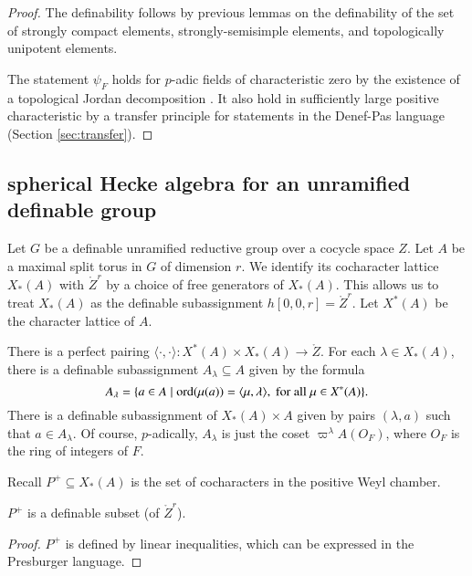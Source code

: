 \begin{proof} The definability follows by previous lemmas on the
  definability of the set of strongly compact elements,
  strongly-semisimple elements, and topologically unipotent elements.

The statement $\psi_F$ holds for $p$-adic fields of characteristic
zero by the existence of a topological Jordan decomposition
\cite{hales1993simple}.  It also hold in sufficiently large positive
characteristic by a transfer principle for statements in the Denef-Pas
language (Section \ref{sec:transfer}).
\end{proof}

\subsection{spherical Hecke algebra for an unramified definable group}

Let $G$ be a definable unramified reductive group over a cocycle space
$Z$.  Let $A$ be a maximal split torus in $G$ of dimension $r$.  We
identify its cocharacter lattice  $X_*(A)$ with $\ring{Z}^r$ by a
choice of free generators of $X_*(A)$.  This allows us to treat
$X_*(A)$ as the definable subassignment $h[0,0,r] = \ring{Z}^r$.  Let
$X^*(A)$ be the character lattice  of $A$.

There is a perfect pairing $\langle\cdot,\cdot\rangle:X^*(A)\times
X_*(A) \to \ring{Z}$.  For each $\lambda\in X_*(A)$, there is a
definable subassignment $A_\lambda \subseteq A$ given by the formula
\begin{equation}\label{eqn:alambda}
A_\lambda = \{ a \in A \mid {\operatorname{ord}}(\mu(a)) 
= \langle{\mu,\lambda}\rangle,\text{ for all } \mu\in X^*(A) \}.
\end{equation}
There is a definable subassignment of $X_*(A)\times A$ given by pairs
$(\lambda,a)$ such that $a\in A_\lambda$.  Of course, $p$-adically,
$A_\lambda$ is just the coset $\varpi^\lambda A(O_F)$, where $O_F$ is
the ring of integers of $F$.

Recall $P^+\subseteq X_*(A)$ is the set of cocharacters in the positive
Weyl chamber.

\begin{lemma} 
  $P^+$ is a definable subset (of $\ring{Z}^r$).
\end{lemma}

\begin{proof} 
  $P^+$ is defined by linear inequalities, which can be expressed in
  the Presburger language.
\end{proof}

